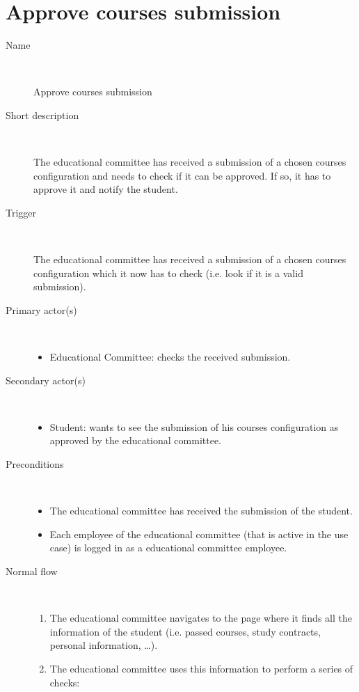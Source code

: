 \section{Approve courses submission}
\begin{description}
	\item[Name] \
		\par Approve courses submission
	\item[Short description] \ 
			\par The educational committee has received a submission of a chosen courses
			configuration and needs to check if it can be approved. If so, it has to
			approve it and notify the student.
	\item[Trigger] \ 
			\par The educational committee has received a submission of a chosen courses
			configuration which it now has to check (i.e. look if it is a valid submission).
	\item[Primary actor(s)] \ 
		\begin{itemize}
		  \item Educational Committee: checks the received submission.
		\end{itemize}
	\item[Secondary actor(s)] \ 
		\begin{itemize}
		  \item Student: wants to see the submission of his courses configuration as
		  approved by the educational committee.
		\end{itemize} 
	\item[Preconditions] \ 
	\begin{itemize}
		\item The educational committee has received the submission of the student.
		\item Each employee of the educational committee (that is active in the use
		case) is logged in as a educational committee employee.
	\end{itemize}
	\item[Normal flow] \ 
	\begin{enumerate}
	  	\item The educational committee navigates to the page where it finds all the
	  	information of the student (i.e. passed courses, study contracts, personal
	  	information, \ldots).
	  	\item The educational committee uses this information to perform a series of
	  	checks:

\end{enumerate}
\end{description}
